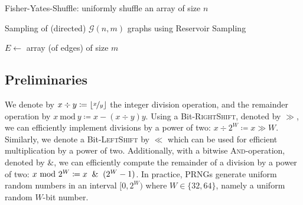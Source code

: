 \documentclass[a4paper, UKenglish, cleveref, autoref, thm-restate]{lipics-v2021}
\newcommand{\Mod}[1]{\ \mathrm{mod}\ #1}
\begin{document}
\begin{algorithm}[!htb] \label{alg:fy}
    \caption{Fisher-Yates-Shuffle: uniformly shuffle an array of size $n$}
\end{algorithm}


\begin{algorithm}[!htb] \label{alg:gnm}
    \caption{Sampling of (directed) $\mathcal{G}(n,m)$ graphs using Reservoir Sampling}
    $E \leftarrow$ array (of edges) of size $m$\;
    \;
\end{algorithm}


\subsection{Preliminaries}\label{sec:1.2}
We denote by $x \div y \coloneqq \lfloor\nicefrac{x}{y}\rfloor$ the integer division operation, and the remainder operation by $x \Mod y \coloneqq x - (x \div y)y$. 
Using a Bit-\textsc{RightShift}, denoted by $\gg$, we can efficiently implement divisions by a power of two: $x \div 2^W \coloneqq x \gg W$.
Similarly, we denote a Bit-\textsc{LeftShift} by $\ll$ which can be used for efficient multiplication by a power of two.
Additionally, with a bitwise \textsc{And}-operation, denoted by $\&$, we can efficiently compute the remainder of a division by a power of two: $x \Mod 2^W \coloneqq x \And (2^W - 1)$.
In practice, PRNGs generate uniform random numbers in an interval $[0,2^W)$ where $W \in \{32,64\}$, namely a uniform random $W$-bit number.
\end{document}
